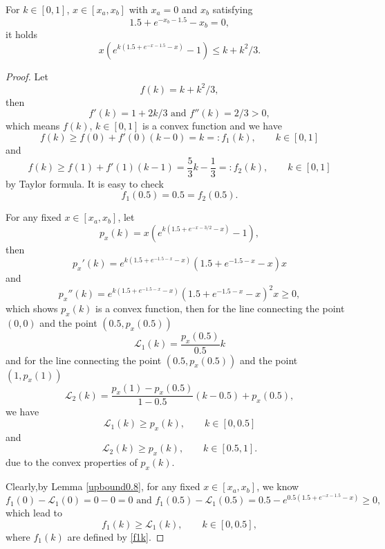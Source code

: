 \documentclass{HZNUMCM}
\begin{document}
\begin{lemma}\label{upbound}
For   $k \in [0,1]$, $x \in [x_a,x_b]$ with $x_a=0$ and $x_b$ satisfying
$$
1.5+e^{-x_b-1.5}-x_b=0,
$$ it holds
\begin{equation}\label{inequality_upbound}
x (e^{k (1.5 + e^{-x - 1.5} - x)}-1)\leqslant k + k^2/3.
\end{equation}
\end{lemma}
\begin{proof}
Let $$f(k)=k+k^2/3,$$
then $$f'(k)=1+2k/3\text{~and~}f''(k)=2/3>0,$$
which means $f(k)$, $k\in[0,1]$ is a convex function  and we have
\begin{equation}\label{f1k}
f(k)\geqslant f(0)+f'(0)(k-0)=k=:f_1(k),\qquad  k\in[0,1] \end{equation}
{and}
\begin{equation}\label{f2k}
f(k)\geqslant  f(1)+f'(1)(k-1)= \frac 5 3 k-\frac 1 3=:f_2(k),\qquad  k\in[0,1]
\end{equation}
by Taylor formula. It is easy to check $$
f_1(0.5)=0.5=f_2(0.5).$$

For any fixed $x\in[x_a,x_b]$,  let
$$
p_x(k)=x (e^{k (1.5 + e^{-x -3/ 2} - x)}-1),
$$then
$$
p_x'(k)=e^{k \left(1.5 +e^{-1.5-x}-x\right)} \left(1.5 +e^{-1.5-x}-x\right) x
$$and$$
p_x''(k)=e^{k \left(1.5 +e^{-1.5-x}-x\right)} \left(1.5 +e^{-1.5-x}-x\right)^2 x\geqslant 0,
$$which shows $p_x(k)$ is a convex function, then for the line connecting the point $(0,0)$ and  the point $(0.5, p_x(0.5))$
$$
\mathcal{L}_1(k)=\frac{p_x(0.5)}{0.5}k
$$ and for the line connecting  the point $(0.5, p_x(0.5))$ and  the point $(1,p_x(1))$
$$
\mathcal{L}_2(k)=\frac{p_x(1)-p_x(0.5)}{1-0.5}(k-0.5)+p_x(0.5),
$$
we have
\begin{equation}\label{lp1}
\mathcal{L}_1(k)\geqslant p_x(k),\qquad k\in[0,0.5]
\end{equation}
and
\begin{equation}\label{lp2}
\mathcal{L}_2(k)\geqslant p_x(k),\qquad k\in[0.5,1].
\end{equation}
due to the convex properties of $p_x(k)$.

Clearly,by Lemma \ref{upbound0.8}, for any  fixed $x\in[x_a,x_b]$, we know
$$
f_1(0)-\mathcal{L}_1(0)=0-0=0\text{~and~}f_1(0.5)-\mathcal{L}_1(0.5)=0.5-e^{0.5(1.5+e^{-x-1.5}-x)}\geqslant 0,
$$which lead to
\begin{equation}\label{fl1}
f_1(k)\geqslant \mathcal{L}_1(k),\qquad k\in[0,0.5],
\end{equation}
where  $f_1(k)$ are defined by  \eqref{f1k}.


\end{proof}
\end{document}

